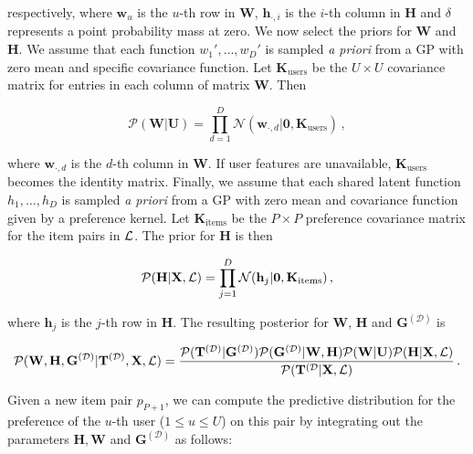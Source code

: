 respectively, where $\mathbf{w}_u$ is the $u$-th row in $\mathbf{W}$, $\mathbf{h}_{\cdot,i}$ is the $i$-th column in $\mathbf{H}$
and $\delta$ represents a point probability mass at zero.
We now select the priors for $\mathbf{W}$ and $\mathbf{H}$. 
We assume that each function $w_1',\ldots,w_D'$ is sampled \textit{a priori} from a GP
with zero mean and specific covariance function. Let $\mathbf{K}_\text{users}$ be the $U \times U$ 
covariance matrix for entries in each column of matrix $\mathbf{W}$. Then

\begin{equation}
\mathcal{P}(\mathbf{W}|\mathbf{U})=  
\prod_{d=1}^D \mathcal{N}(\mathbf{w}_{\cdot,d}|\mathbf{0},\mathbf{K}_\text{users})\,,\label{eq:priorW}
\end{equation}

where $\mathbf{w}_{\cdot,d}$ is the $d$-th column in $\mathbf{W}$.
If user features are unavailable, $\mathbf{K}_\text{users}$ becomes the identity matrix.
Finally, we assume that each shared latent function $h_1,\ldots,h_D$ is sampled \textit{a priori} from a GP
with zero mean and covariance function given by a preference kernel. 
Let $\mathbf{K}_\text{items}$ be the $P \times P$ preference covariance 
matrix for the item pairs in $\mathcal{L}$. The prior for $\mathbf{H}$ is then 

\begin{equation}
\mathcal{P}(\mathbf{H}|\mathbf{X},\mathcal{L}) = 
\prod_{j=1}^{D}\mathcal{N}(\mathbf{h}_j|\mathbf{0},\mathbf{K}_\text{items})\,,\label{eq:priorH}
\end{equation}

where $\mathbf{h}_j$ is the $j$-th row in $\mathbf{H}$. The resulting posterior for $\mathbf{W}$, $\mathbf{H}$ and $\mathbf{G}^{(\mathcal{D})}$ is

\begin{equation}
\mathcal{P}(\mathbf{W},\mathbf{H},\mathbf{G}^{(\mathcal{D})}|\mathbf{T}^{(\mathcal{D})},\mathbf{X},\mathcal{L}) =
\frac{\mathcal{P}(\mathbf{T}^{(\mathcal{D})}|\mathbf{G}^{(\mathcal{D})})
\mathcal{P}(\mathbf{G}^{(\mathcal{D})}|\mathbf{W},\mathbf{H})\mathcal{P}(\mathbf{W}|\mathbf{U})\mathcal{P}
(\mathbf{H}|\mathbf{X},\mathcal{L})}{\mathcal{P}(\mathbf{T}^{(\mathcal{D}}|\mathbf{X},\mathcal{L})}\,.\label{eq:post}
\end{equation}

Given a new item pair $p_{P+1}$, we can compute the predictive distribution for the preference of the $u$-th user ($1 \leq u \leq U$) on this pair by integrating out the parameters $\mathbf{H},\mathbf{W}$ and $\mathbf{G}^{(\mathcal{D})}$ as follows:

